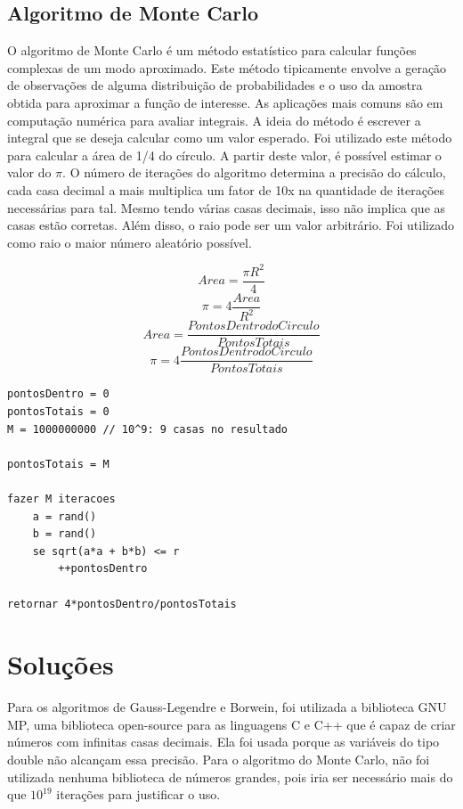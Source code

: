 \documentclass[a4paper]{article}
\begin{document}
\subsection{Algoritmo de Monte Carlo}
O algoritmo de Monte Carlo é um método estatístico para calcular funções complexas
de um modo aproximado. Este método tipicamente envolve a geração de observações de 
alguma distribuição de probabilidades e o uso da amostra obtida para aproximar a 
função de interesse. As aplicações mais comuns são em computação numérica para avaliar 
integrais. A ideia do método é escrever a integral que se deseja calcular como um valor 
esperado. Foi utilizado este método para calcular a área de 1/4 do círculo. A partir 
deste valor, é possível estimar o valor do \begin{math}\pi\end{math}. O número de iterações do algoritmo determina 
a precisão do cálculo, cada casa decimal a mais multiplica um fator de 10x na quantidade
de iterações necessárias para tal. Mesmo tendo várias casas decimais, isso
não implica que as casas estão corretas. Além disso, o raio pode ser um valor arbitrário. 
Foi utilizado como raio o maior número aleatório possível.

\begin{displaymath}
	Area = \frac{\pi R^2}{4}
\end{displaymath}
\begin{displaymath}
	\pi = 4\frac{Area}{R^2}
\end{displaymath}
\begin{displaymath}
	Area = \frac{{Pontos Dentro do Circulo}}{{Pontos Totais}}
\end{displaymath}
\begin{displaymath}
	\pi = 4\frac{{Pontos Dentro do Circulo}}{{Pontos Totais}}
\end{displaymath}

\begin{lstlisting}[caption=Algoritmo de Monte Carlo, float=h]
pontosDentro = 0
pontosTotais = 0
M = 1000000000 // 10^9: 9 casas no resultado

pontosTotais = M

fazer M iteracoes
	a = rand()
	b = rand()
	se sqrt(a*a + b*b) <= r
		++pontosDentro
		
retornar 4*pontosDentro/pontosTotais
\end{lstlisting}

\section{Soluções}
Para os algoritmos de Gauss-Legendre e Borwein, foi utilizada a biblioteca GNU MP, uma 
biblioteca open-source para as linguagens C e C++ que é capaz de criar números 
com infinitas casas decimais. Ela foi usada porque as variáveis do tipo double 
não alcançam essa precisão. Para o algoritmo do Monte Carlo, não foi utilizada 
nenhuma biblioteca de números grandes, pois iria ser necessário mais do que \begin{math}10^{19}\end{math} 
iterações para justificar o uso.
\end{document}
